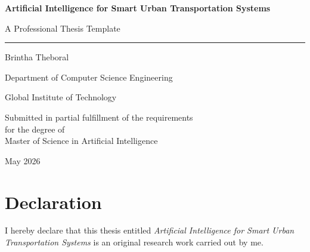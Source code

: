 \documentclass[12pt,a4paper]{report}
\begin{document}
	
	
	\begin{titlepage}
		
		\centering
		
		\vspace*{2cm}
		
		{\Huge\bfseries
			Artificial Intelligence for Smart Urban Transportation Systems
			\par}
		
		\vspace{1cm}
		
		{\Large
			A Professional Thesis Template
			\par}
		
		\vspace{2cm}
		
		\rule{6cm}{6cm}
		
		\vspace{2cm}
		
		{\Large
			Brintha Theboral
			\par}
		
		\vspace{1cm}
		
		Department of Computer Science Engineering
		
		Global Institute of Technology
		
		\vfill
		
		Submitted in partial fulfillment of the requirements\\
		for the degree of\\
		Master of Science in Artificial Intelligence
		
		\vfill
		
		{\large May 2026}
		
	\end{titlepage}
	
	
	\chapter*{Declaration}
	
	I hereby declare that this thesis entitled
	\textit{Artificial Intelligence for Smart Urban Transportation Systems}
	is an original research work carried out by me.
	
	\newpage
	
\end{document}
